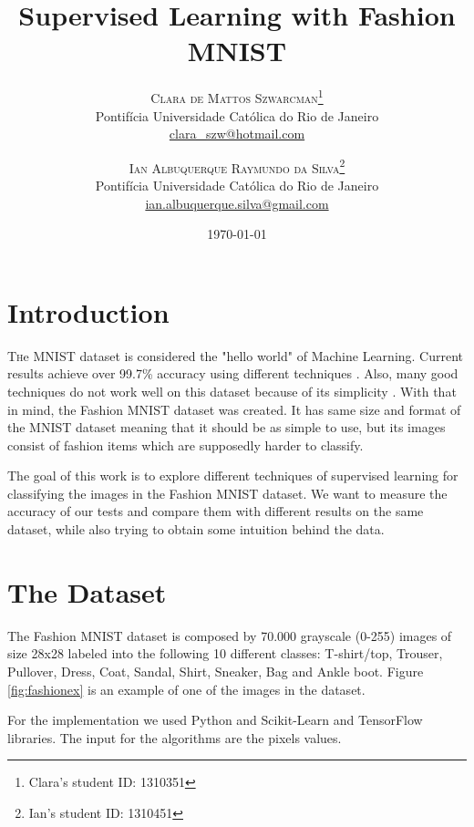 \documentclass[twoside,twocolumn]{article}
\title{Supervised Learning with Fashion MNIST} %
\author{%
\textsc{Clara de Mattos Szwarcman}\thanks{Clara's student ID: 1310351} \\[1ex] %
\normalsize Pontifícia Universidade Católica do Rio de Janeiro \\ %
\normalsize \href{mailto:clara_szw@hotmail.com}{clara\_szw@hotmail.com} %
\and %
\textsc{Ian Albuquerque Raymundo da Silva}\thanks{Ian's student ID: 1310451} \\[1ex] %
\normalsize Pontifícia Universidade Católica do Rio de Janeiro \\ %
\normalsize \href{mailto:ian.albuquerque.silva@gmail.com}{ian.albuquerque.silva@gmail.com} %
}
\date{\today} %
\begin{document}
\maketitle


\section{Introduction}

\lettrine[nindent=0em,lines=3]{T} he MNIST dataset is considered the "hello world" of Machine Learning.
Current results achieve over 99.7\% accuracy using different techniques
\cite{LWan:2013dg} \cite{DCirean:2012dg} \cite{ISato:2015dg} \cite{JRChang:2015dg} \cite{CYLee:2015dg}.
Also, many good techniques do not work well on this dataset because of its simplicity \cite{CFran:2017dg}.
With that in mind, the Fashion MNIST dataset \cite{FashionMNIST} was created. It has same size and format
of the MNIST dataset meaning that
it should be as simple to use, but its images consist of fashion items which are supposedly harder to
classify.

The goal of this work is to explore different techniques of supervised learning for classifying the images
in the Fashion MNIST dataset. We want to measure the accuracy of our tests and compare them with different
results on the same dataset, while also trying to obtain some intuition behind the data.\


\section{The Dataset}

    The Fashion MNIST dataset is composed by 70.000 grayscale (0-255) images of size 28x28 labeled into the following 10 different classes: T-shirt/top, Trouser, Pullover, Dress, Coat, Sandal, Shirt, Sneaker, Bag and Ankle boot. Figure \ref{fig:fashionex} is an example of one of the images in the dataset.
	
    For the implementation we used Python and Scikit-Learn \cite{scikitlearn} and TensorFlow \cite{tensorflow} libraries. The input for the algorithms are the pixels values.
\end{document}
